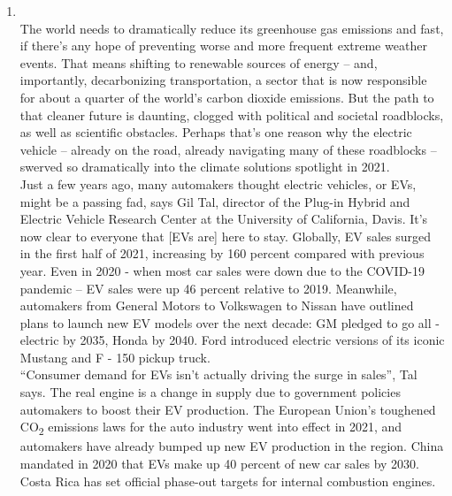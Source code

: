 \documentclass[12pt]{article}
\newcommand{\sub}[1]{\textsubscript{#1}}
\begin{document}
\begin{enumerate}
    \item {}\\
      The world needs to dramatically reduce its greenhouse gas emissions and fast, if there’s any hope of preventing worse and more frequent extreme weather events. That means shifting to renewable sources of energy – and, importantly, decarbonizing transportation, a sector that is now responsible for about a quarter of the world’s carbon dioxide emissions. But the path to that cleaner future is daunting, clogged with political and societal roadblocks, as well as scientific obstacles. Perhaps that’s one reason why the electric vehicle – already on the road, already navigating many of these roadblocks – swerved so dramatically into the climate solutions spotlight in 2021.\\

      Just a few years ago, many automakers thought electric vehicles, or EVs, might be a passing fad, says Gil Tal, director of the Plug-in Hybrid and Electric Vehicle Research Center at the University of California, Davis. It’s now clear to everyone that [EVs are] here to stay. Globally, EV sales surged in the first half of 2021, increasing by 160 percent compared with previous year. Even in 2020 - when most car sales were down due to the COVID-19 pandemic – EV sales were up 46 percent relative to 2019. Meanwhile, automakers from General Motors to Volkswagen to Nissan have outlined plans to launch new EV models over the next decade: GM pledged to go all - electric by 2035, Honda by 2040. Ford introduced electric versions of its iconic Mustang and F - 150 pickup truck.\\

      “Consumer demand for EVs isn’t actually driving the surge in sales”, Tal says. The real engine is a change in supply due to government policies automakers to boost their EV production. The European Union’s toughened CO\sub{2} emissions laws for the auto industry went into effect in 2021, and automakers have already bumped up new EV production in the region. China mandated in 2020 that EVs make up 40 percent of new car sales by 2030. Costa Rica has set official phase-out targets for internal combustion engines.


\end{enumerate}
\end{document}
